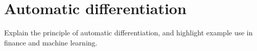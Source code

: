 \section{Automatic differentiation}

\begin{tcolorbox}[width=\linewidth, sharp corners=all, colback=white!95!black]
    Explain the principle of automatic differentiation, and highlight example use in finance and machine learning.
\end{tcolorbox}